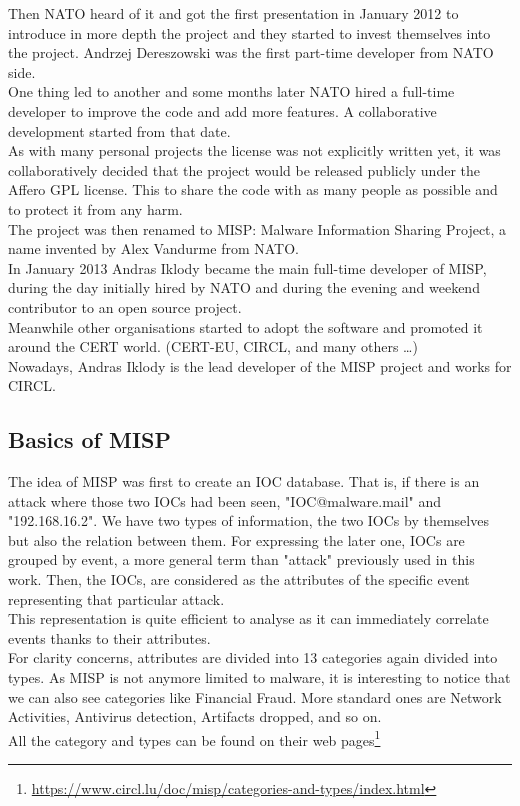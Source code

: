 \documentclass{eplmastersthesis}
\begin{document}
Then NATO heard of it and got the first presentation in January 2012 to introduce in more depth the project and they started to invest themselves into the project. Andrzej Dereszowski was the first part-time developer from NATO side.\\
One thing led to another and some months later NATO hired a full-time developer to improve the code and add more features. A collaborative development started from that date. \\
As with many personal projects the license was not explicitly written yet, it was collaboratively decided that the project would be released publicly under the Affero GPL license. This to share the code with as many people as possible and to protect it from any harm.\\
The project was then renamed to MISP: Malware Information Sharing Project, a name invented by Alex Vandurme from NATO.\\
In January 2013 Andras Iklody became the main full-time developer of MISP, during the day initially hired by NATO and during the evening and weekend contributor to an open source project.\\

Meanwhile other organisations started to adopt the software and promoted it around the CERT world. (CERT-EU, CIRCL, and many others …)\\
Nowadays, Andras Iklody is the lead developer of the MISP project and works for CIRCL.\\

\subsection{Basics of MISP}
The idea of MISP was first to create an IOC database. That is, if there is an attack where those two IOCs had been seen, "IOC@malware.mail" and "192.168.16.2". We have two types of information, the two IOCs by themselves but also the relation between them. For expressing the later one, IOCs are grouped by event, a more general term than "attack" previously used in this work.  Then, the IOCs, are considered as the attributes of the specific event representing that particular attack.\\
This representation is quite efficient to analyse as it can immediately correlate events thanks to their attributes.\\

For clarity concerns, attributes are divided into 13 categories again divided into types. As MISP is not anymore limited to malware, it is interesting to notice that we can also see categories like Financial Fraud. More standard ones are Network Activities, Antivirus detection, Artifacts dropped, and so on.\\
All the category and types can be found on their web pages\footnote {\url{https://www.circl.lu/doc/misp/categories-and-types/index.html}}
\end{document}
